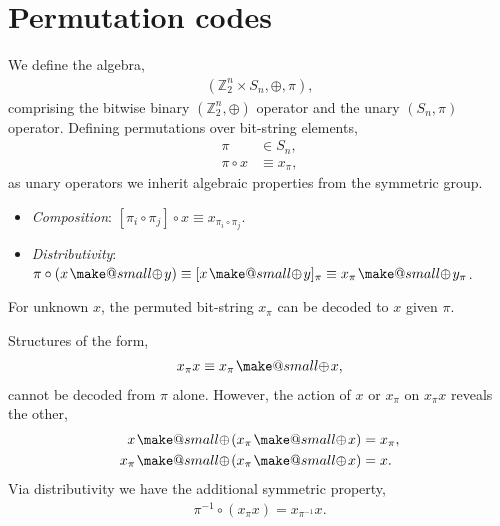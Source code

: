 \documentclass[twocolumn, aps, amsmath, amssymb, nofootinbib, superscriptaddress, longbibliography, doublefloatfix, table-of-contents, eqsecnum, rmp]{revtex4-2}
\makeatletter
\newcommand{\soplus}{{{\hspace{1pt}}{\mathbin{\mathpalette\make@small{\mathbin\oplus}}}}{\hspace{1pt}}}
\newcommand{\make@small}[2]{%
  \vcenter{\hbox{%
    \scalebox{0.6}{$\m@th#1#2$}%
  }}%
}
\makeatother
\begin{document}

\section{Permutation codes}

We define the algebra,
\begin{align}
	(\mathbb{Z}_2^n \times S_n, \oplus,\pi),
\end{align}
comprising the bitwise binary $(\mathbb{Z}_2^n,\oplus)$ operator and the unary $(S_n,\pi)$ operator. Defining permutations over bit-string elements,
\begin{align}
	\pi &\in S_n,\nonumber\\
	\pi\circ x &\equiv x_\pi,
\end{align}
as unary operators we inherit algebraic properties from the symmetric group.
\begin{itemize}
	\item \emph{Composition}: $[\pi_i \circ \pi_j]\circ x \equiv x_{\pi_i\circ \pi_j}$.
	\item \emph{Distributivity}: $\pi\circ(x\soplus y) \equiv [x\soplus y]_\pi \equiv x_\pi \soplus y_\pi$.
\end{itemize}
For unknown $x$, the permuted bit-string $x_\pi$ can be decoded to $x$ given $\pi$.

Structures of the form,
\begin{align}
	x_\pi x \equiv x_\pi \soplus x,
\end{align}
cannot be decoded from $\pi$ alone. However, the action of $x$ or $x_\pi$ on $x_\pi x$ reveals the other,
\begin{align}
	x \soplus (x_\pi \soplus x) & = x_\pi,\nonumber\\
	x_\pi \soplus (x_\pi \soplus x) &= x.
\end{align}
Via distributivity we have the additional symmetric property,
\begin{align}
	\pi^{-1} \circ (x_\pi x)	 = x_{\pi^{-1}} x.
\end{align}
\end{document}
